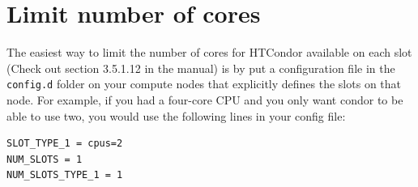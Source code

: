\documentclass{article}
\begin{document}
\section{Limit number of cores}
The easiest way to limit the number of cores for HTCondor available on each slot (Check out section 3.5.1.12 in the manual) is by put a configuration file in the \verb+config.d+ 
folder on your compute nodes that explicitly defines the slots on that node. For example, if you had a four-core CPU and you only want condor to be able to use two,
you would use the following lines in your config file:
\begin{verbatim}
SLOT_TYPE_1 = cpus=2
NUM_SLOTS = 1
NUM_SLOTS_TYPE_1 = 1
\end{verbatim}




%         

%
%
%

\end{document}
